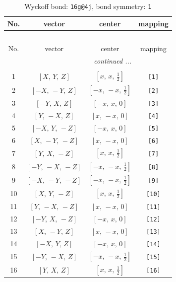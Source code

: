 \documentclass[fleqn,8pt]{jsarticle}
\begin{document}
\begin{longtable}{cccc}
\caption{Wyckoff bond: {\tt 16g@4j}, bond symmetry: {\tt 1}}
 \\
 \hline \hline
No. & vector & center & mapping \\ \hline \endfirsthead

\multicolumn{3}{l}{\tablename\ \thetable{}} \\
 \hline \hline
No. & vector & center & mapping \\ \hline \endhead

 \hline \hline
\multicolumn{3}{r}{\footnotesize\it continued ...} \\ \endfoot

 \hline \hline
\multicolumn{3}{r}{} \\ \endlastfoot

1 & $\left[ X,\, Y,\, Z \right]$ & $\left[ x,\, x,\, \frac{1}{2} \right]$ & {\tt [1]} \\ \hline
2 & $\left[ - X,\, - Y,\, Z \right]$ & $\left[ - x,\, - x,\, \frac{1}{2} \right]$ & {\tt [2]} \\ \hline
3 & $\left[ - Y,\, X,\, Z \right]$ & $\left[ - x,\, x,\, 0 \right]$ & {\tt [3]} \\ \hline
4 & $\left[ Y,\, - X,\, Z \right]$ & $\left[ x,\, - x,\, 0 \right]$ & {\tt [4]} \\ \hline
5 & $\left[ - X,\, Y,\, - Z \right]$ & $\left[ - x,\, x,\, 0 \right]$ & {\tt [5]} \\ \hline
6 & $\left[ X,\, - Y,\, - Z \right]$ & $\left[ x,\, - x,\, 0 \right]$ & {\tt [6]} \\ \hline
7 & $\left[ Y,\, X,\, - Z \right]$ & $\left[ x,\, x,\, \frac{1}{2} \right]$ & {\tt [7]} \\ \hline
8 & $\left[ - Y,\, - X,\, - Z \right]$ & $\left[ - x,\, - x,\, \frac{1}{2} \right]$ & {\tt [8]} \\ \hline
9 & $\left[ - X,\, - Y,\, - Z \right]$ & $\left[ - x,\, - x,\, \frac{1}{2} \right]$ & {\tt [9]} \\ \hline
10 & $\left[ X,\, Y,\, - Z \right]$ & $\left[ x,\, x,\, \frac{1}{2} \right]$ & {\tt [10]} \\ \hline
11 & $\left[ Y,\, - X,\, - Z \right]$ & $\left[ x,\, - x,\, 0 \right]$ & {\tt [11]} \\ \hline
12 & $\left[ - Y,\, X,\, - Z \right]$ & $\left[ - x,\, x,\, 0 \right]$ & {\tt [12]} \\ \hline
13 & $\left[ X,\, - Y,\, Z \right]$ & $\left[ x,\, - x,\, 0 \right]$ & {\tt [13]} \\ \hline
14 & $\left[ - X,\, Y,\, Z \right]$ & $\left[ - x,\, x,\, 0 \right]$ & {\tt [14]} \\ \hline
15 & $\left[ - Y,\, - X,\, Z \right]$ & $\left[ - x,\, - x,\, \frac{1}{2} \right]$ & {\tt [15]} \\ \hline
16 & $\left[ Y,\, X,\, Z \right]$ & $\left[ x,\, x,\, \frac{1}{2} \right]$ & {\tt [16]} \\
\end{longtable}
\end{document}
